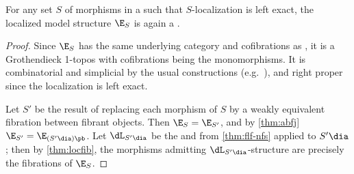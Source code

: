 \begin{thm}\label{thm:lexloc-ttmt}
  For any set $S$ of morphisms in a \ttmt \E such that $S$-localization is left exact, the localized model structure $\E_S$ is again a \ttmt.
\end{thm}
\begin{proof}
  Since $\E_S$ has the same underlying category and cofibrations as \E, it is a \slcc Grothendieck 1-topos with cofibrations being the monomorphisms.
  It is combinatorial and simplicial by the usual constructions (e.g.~\cite[Theorem 4.1.1]{hirschhorn:modelcats}), and right proper since the localization is left exact.

  Let $S'$ be the result of replacing each morphism of $S$ by a weakly equivalent fibration between fibrant objects.
  Then $\E_S = \E_{S'}$, and by \cref{thm:abfj} $\E_{S'} = \E_{(S'{}\dia)\pb}$.
  Let $\dL_{S'{}\dia}$ be the \local and \stratified \nfs from \cref{thm:flf-nfs} applied to $S'{}\dia$;
  then by \cref{thm:locfib}, the morphisms admitting $\dL_{S'{}\dia}$-structure are precisely the fibrations of $\E_S$.
\end{proof}


